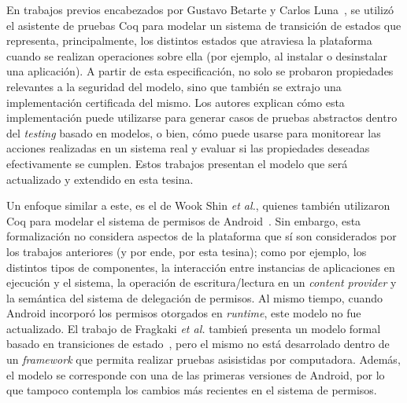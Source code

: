 En trabajos previos encabezados por Gustavo Betarte y Carlos
Luna~\cite{betarte-2017, betarte-2016, luna-cleiej}, se utilizó el asistente de
pruebas Coq para modelar un sistema de transición de estados que representa,
principalmente, los distintos estados que atraviesa la plataforma cuando se
realizan operaciones sobre ella (por ejemplo, al instalar o desinstalar una
aplicación). A partir de esta especificación, no solo se probaron propiedades
relevantes a la seguridad del modelo, sino que también se extrajo una
implementación certificada del mismo. Los autores explican cómo esta
implementación puede utilizarse para generar casos de pruebas abstractos dentro
del \textit{testing} basado en modelos, o bien, cómo puede usarse para
monitorear las acciones realizadas en un sistema real y evaluar si las
propiedades deseadas efectivamente se cumplen. Estos trabajos presentan el
modelo que será actualizado y extendido en esta tesina.

Un enfoque similar a este, es el de Wook Shin \textit{et al.}, quienes también
utilizaron Coq para modelar el sistema de permisos de Android~\cite{shin}. Sin
embargo, esta formalización no considera aspectos de la plataforma que sí son
considerados por los trabajos anteriores (y por ende, por esta tesina); como por
ejemplo, los distintos tipos de componentes, la interacción entre instancias de
aplicaciones en ejecución y el sistema, la operación de escritura/lectura en un
\textit{content provider} y la semántica del sistema de delegación de permisos.
Al mismo tiempo, cuando Android incorporó los permisos otorgados en
\textit{runtime}, este modelo no fue actualizado. El trabajo de Fragkaki \textit{et al.}
tambień presenta un modelo formal basado en transiciones de
estado~\cite{fragkaki}, pero el mismo no está desarrolado dentro de un
\textit{framework} que permita realizar pruebas asisistidas por computadora.
Además, el modelo se corresponde con una de las primeras versiones de Android,
por lo que tampoco contempla los cambios más recientes en el sistema de
permisos.
